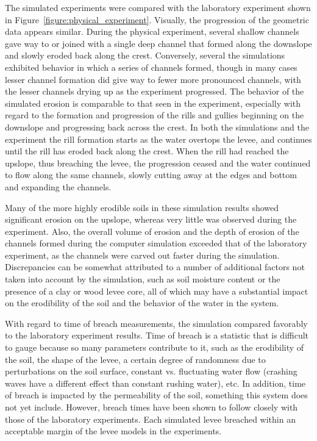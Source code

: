 The simulated experiments were compared with the laboratory
experiment shown in Figure~\ref{figure:physical_experiment}.  
% 
Visually, the progression of the geometric data appears similar.
During the physical experiment, several shallow channels gave way to
or joined with a single deep channel that formed along the downslope
and slowly eroded back along the crest.  Conversely, several the
simulations exhibited behavior in which a series of channels formed,
though in many cases lesser channel formation did give way to fewer
more pronounced channels, with the lesser channels drying up as the
experiment progressed.  The behavior of the simulated erosion is
comparable to that seen in the experiment, especially with regard to
the formation and progression of the rills and gullies beginning on
the downslope and progressing back across the crest.  In both the
simulations and the experiment the rill formation starts as the water
overtops the levee, and continues until the rill has eroded back along
the crest.  When the rill had reached the upslope, thus breaching the
levee, the progression ceased and the water continued to flow along
the same channels, slowly cutting away at the edges and bottom and
expanding the channels.

Many of the more highly erodible soils in these simulation results
showed significant erosion on the upslope, whereas very little was
observed during the experiment.  Also, the overall volume of erosion
and the depth of erosion of the channels formed during the computer
simulation exceeded that of the laboratory experiment, as the channels
were carved out faster during the simulation.  Discrepancies can be
somewhat attributed to a number of additional factors not taken into
account by the simulation, such as soil moisture content or the
presence of a clay or wood levee core, all of which may have a
substantial impact on the erodibility of the soil and the behavior of
the water in the system.  

With regard to time of breach measurements, the simulation compared favorably
to the laboratory experiment results. Time of breach is a statistic that is 
difficult to gauge because so many parameters contribute to it, such as the erodibility of the soil, the shape of the levee, a certain degree of randomness due to perturbations on the soil surface, constant vs. fluctuating water flow (crashing waves have a different effect than constant rushing water), etc. In addition, time of breach is impacted by the permeability of the soil, something this system does not yet include.
However, breach times have been shown to follow closely with those of the laboratory experiments. Each simulated levee breached within an acceptable margin of the levee models in the experiments.

